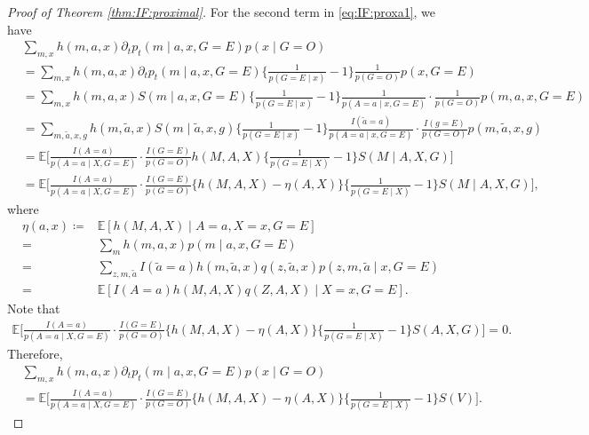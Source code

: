 \documentclass[10pt]{article}
\newcommand{\E}{\mathbb{E}}
\begin{document}
\begin{proof}[Proof of Theorem \ref{thm:IF:proximal}]
For the second term in \eqref{eq:IF:proxa1}, we have
{\footnotesize \begin{align*}
&\sum_{m,x} h(m,a,x)\partial_t p_t(m\mid a,x,G=E)p(x\mid G=O)\\
&=\sum_{m,x} h(m,a,x)\partial_t p_t(m\mid a,x,G=E)\{\frac{1}{p(G=E\mid x)}-1\}\frac{1}{p(G=O)}p(x,G=E)\\
&=\sum_{m,x} h(m,a,x)S(m\mid a,x,G=E)\{\frac{1}{p(G=E\mid x)}-1\}\frac{1}{p(A=a\mid x,G=E)}\cdot\frac{1}{p(G=O)}p(m,a,x,G=E)\\
&=\sum_{m,\tilde{a},x,g} h(m,\tilde{a},x)S(m\mid \tilde{a},x,g)\{\frac{1}{p(G=E\mid x)}-1\}\frac{I(\tilde{a}=a)}{p(A=a\mid x,G=E)}\cdot\frac{I(g=E)}{p(G=O)}p(m,\tilde{a},x,g)\\
&=\E\Big[
\frac{I(A=a)}{p(A=a\mid X,G=E)}\cdot\frac{I(G=E)}{p(G=O)}
h(M,A,X)\{\frac{1}{p(G=E\mid X)}-1\}S(M\mid A,X,G)
\Big]\\
&=\E\Big[
\frac{I(A=a)}{p(A=a\mid X,G=E)}\cdot\frac{I(G=E)}{p(G=O)}
\{h(M,A,X)-\eta(A,X)\}\{\frac{1}{p(G=E\mid X)}-1\}S(M\mid A,X,G)
\Big],
\end{align*}}
where
\begin{align*}
\eta(a,x)\coloneqq&\E[h(M,A,X)\mid A=a,X=x,G=E]\\
=&\sum_m h(m,a,x)p(m\mid a,x,G=E)\\
=&\sum_{z,m,\tilde{a}} I(\tilde{a}=a)h(m,\tilde{a},x)q(z,\tilde{a},x)p(z,m,\tilde{a}\mid x,G=E)\\
=&\E[ I(A=a)h(M,A,X)q(Z,A,X)\mid X=x,G=E ].
\end{align*}
Note that
\begin{align*}
\E\Big[
\frac{I(A=a)}{p(A=a\mid X,G=E)}\cdot\frac{I(G=E)}{p(G=O)}
\{h(M,A,X)-\eta(A,X)\}\{\frac{1}{p(G=E\mid X)}-1\}S(A,X,G)
\Big]=0.
\end{align*}
Therefore,
\begin{equation}
\label{eq:IF:proxa3}
\begin{aligned}
&\sum_{m,x} h(m,a,x)\partial_t p_t(m\mid a,x,G=E)p(x\mid G=O)\\
&=\E\Big[
\frac{I(A=a)}{p(A=a\mid X,G=E)}\cdot\frac{I(G=E)}{p(G=O)}
\{h(M,A,X)-\eta(A,X)\}\{\frac{1}{p(G=E\mid X)}-1\}S(V)
\Big].
\end{aligned}
\end{equation}


\end{proof}
\end{document}
